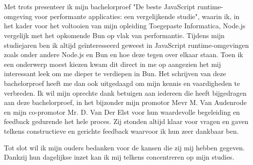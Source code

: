 
\chapter*{}%
\label{ch:voorwoord}


Met trots presenteer ik mijn bachelorproef "De beste JavaScript runtime-omgeving voor performante applicaties: een vergelijkende studie", 
waarin ik, in het kader voor het voltooien van mijn opleiding Toegepaste Informatica, Node.js vergelijk met het opkomende Bun op vlak van performantie.
Tijdens mijn studiejaren ben ik altijd geïnteresseerd geweest in JavaScript runtime-omgevingen zoals onder andere Node.js en Bun en
hoe deze tegen over elkaar staan. Toen ik een onderwerp moest kiezen kwam dit direct in me op aangezien het mij interessant leek om me dieper te verdiepen 
in Bun. Het schrijven van deze bachelorproef heeft me dan ook uitgedaagd om mijn kennis en vaardigheden te verbreden.
\vspace{5mm}
Ik wil mijn oprechte dank betuigen aan iedereen die heeft bijgedragen aan deze bachelorproef, 
in het bijzonder mijn promotor Mevr M. Van Audenrode en mijn co-promotor Mr. D. Van Der Elst voor hun
waardevolle begeleiding en feedback gedurende het hele proces. 
Zij stonden altijd klaar voor vragen en gaven telkens constructieve en gerichte feedback waarvoor ik hun zeer dankbaar ben.
\vspace{5mm}

Tot slot wil ik mijn ouders bedanken voor de kansen die zij mij hebben gegeven. 
Dankzij hun dagelijkse inzet kan ik mij telkens concentreren op mijn studies.


